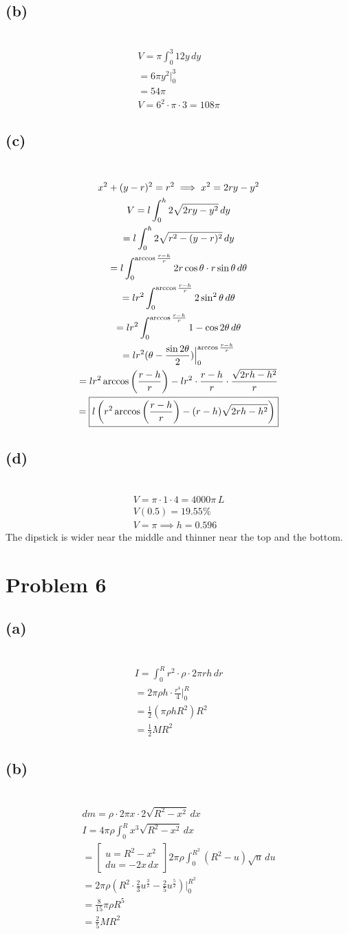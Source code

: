 \documentclass[12pt]{article}
\newcommand*{\paren}[1]{\ensuremath\left(#1\right)}
\newcommand{\at}{\Big|}
\newcommand{\problem}[1]{\section{Problem #1}}
\newcommand{\subproblem}[1]{\subsection{(#1)} \,}
\begin{document}
\subproblem{b}
\begin{gather*}
    V=\pi \int_0^3 12y \, dy\\
    =6\pi y^2\at_0^3\\
    = \boxed{54\pi}\\
    V=6^2\cdot \pi \cdot 3=108\pi 
\end{gather*}

\subproblem{c}
\begin{gather*}
    x^2+(y-r)^2=r^2 \implies x^2=2ry-y^2\\
    V= l \int _0^h  2\sqrt{2ry-y^2} \, dy\\
    =l \int _0^h  2\sqrt{r^2-(y-r)^2} \, dy\\
    = l \int_0^{\arccos \frac{r-h}{r}}  2r\cos \theta \cdot r\sin \theta\,  d\theta \\
    = l r^2 \int_0^{\arccos \frac{r-h}{r}}  2\sin ^2\theta\,  d\theta \\
    = l r^2 \int_0^{\arccos \frac{r-h}{r}}  1- \cos 2\theta \,  d\theta \\
    = lr^2 (\theta - \frac{\sin 2\theta}{2})\at_0^{\arccos \frac{r-h}{r}}\\
    = lr^2\arccos \paren{\frac{r-h}{r}} - lr^2 \cdot \frac{r-h}{r} \cdot \frac{\sqrt{2rh-h^2}}{r}\\
    = \boxed{l\paren{r^2\arccos \paren{\frac{r-h}{r}} - (r-h)\sqrt{2rh-h^2}}}
\end{gather*}

\subproblem{d}
\begin{gather*}
    V=\pi \cdot 1\cdot 4=4000 \pi\, L\\
    V(0.5)=19.55\%\\
    V=\pi  \implies h=0.596
\end{gather*}
The dipstick is wider near the middle and thinner near the top and the bottom.

\problem{6}

\subproblem{a}
\begin{gather*}
    I= \int_0^R r^2 \cdot \rho \cdot 2\pi rh\, dr\\
    = 2\pi \rho h \cdot \frac{r^4}{4}\at_0^R\\
    =\frac{1}{2}(\pi \rho hR^2)R^2\\
    = \boxed{\frac{1}{2}MR^2}
\end{gather*}

\subproblem{b}
\begin{gather*}
    dm=\rho \cdot 2\pi x \cdot 2\sqrt{R^2-x^2} \, dx\\
    I=  4\pi \rho \int_0^R x^3\sqrt{R^2-x^2} \, dx\\
    = \begin{bmatrix}
        u=R^2-x^2\\
        du=-2x\, dx
    \end{bmatrix} 2\pi \rho \int_{0}^{R^2} (R^2-u)\sqrt{u} \, du\\
    = 2\pi \rho (R^2 \cdot \frac{2}{3}u^\frac{3}{2} - \frac{2}{5}u^\frac{5}{2})\at_0^{R^2}\\
    = \frac{8}{15} \pi \rho R^5\\
    = \boxed{\frac{2}{5}MR^2}
\end{gather*}
\end{document}
